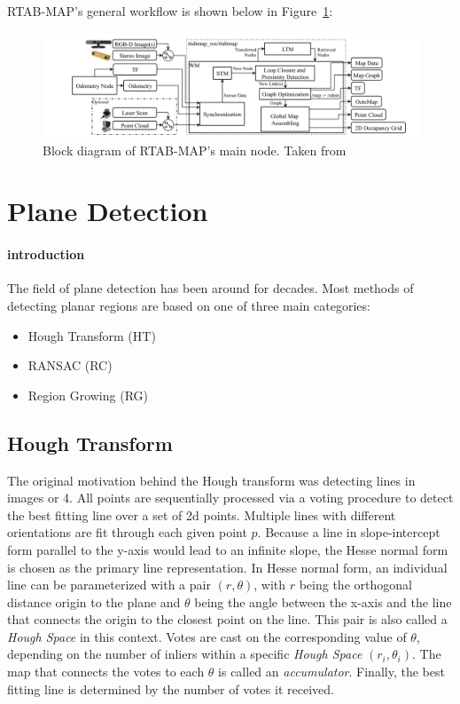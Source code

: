 \documentclass[main.tex]{subfiles}
\begin{document}
RTAB-MAP's general workflow is shown below in Figure~\ref{fig:rtabmap}:
\begin{figure}[!h]
    \centering
    \includegraphics[width=15 cm]{images/rtabmap.png}
    \caption[RTAB-MAP Block Diagram]{Block diagram of RTAB-MAP's main node. Taken from \cite[Figure~1]{Labbé_Michaud_2019}}
    \label{fig:rtabmap}
\end{figure}

\section{Plane Detection}

\paragraph*{introduction}
The field of plane detection has been around for decades. Most methods of detecting planar regions are based on one of three main categories:
\begin{itemize}
    \item Hough Transform (HT)
    \item RANSAC (RC)
    \item Region Growing (RG)
\end{itemize}

\subsection*{Hough Transform}
The original motivation behind the Hough transform was detecting lines in images or 4. All points are sequentially processed via a voting procedure to detect the best fitting line over a set of 2d points.
Multiple lines with different orientations are fit through each given point $p$. 
Because a line in slope-intercept form parallel to the y-axis would lead to an infinite slope, the Hesse normal form is chosen as the primary line representation.
In Hesse normal form, an individual line can be parameterized with a pair $(r, \theta)$, with $r$  being the orthogonal distance origin to the plane and $\theta$ being the angle between the x-axis and the line that connects the origin to the closest point on the line.
This pair is also called a \textit{Hough Space} in this context. Votes are cast on the corresponding value of $\theta$, depending on the number of inliers within a specific \textit{Hough Space} $(r_i,\theta_i)$. The map that connects the
votes to each $\theta$ is called an \textit{accumulator}.
Finally, the best fitting line is determined by the number of votes it received.
\end{document}
